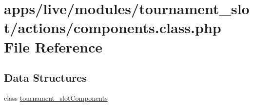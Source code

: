 \hypertarget{live_2modules_2tournament__slot_2actions_2components_8class_8php}{\section{apps/live/modules/tournament\-\_\-slot/actions/components.class.\-php File Reference}
\label{live_2modules_2tournament__slot_2actions_2components_8class_8php}
}
\subsection*{Data Structures}
\begin{DoxyCompactItemize}
\item 
class \hyperlink{classtournament__slot_components}{tournament\-\_\-slot\-Components}
\end{DoxyCompactItemize}
